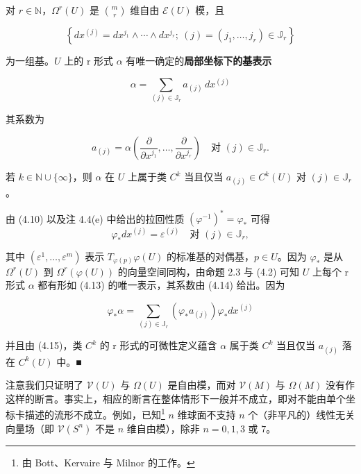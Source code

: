 \begin{remark}
\begin{items}
对 $ r\in\mathbb{N} $，$ \Omega^{r}(U) $ 是 $ \binom{m}{r} $ 维自由 $ \mathcal{E}(U) $ 模，且

\begin{equation}
\left\{ dx^{(j)} = dx^{j_{1}}\wedge\cdots\wedge dx^{j_{r}} ;\ (j) = (j_{1},\ldots,j_{r})\in\mathbb{J}_{r} \right\}\tag{4.12}
\end{equation}

为一组基。$ U $ 上的 r 形式 $ \alpha $ 有唯一确定的\textbf{局部坐标下的基表示}

\begin{equation}
\alpha = \sum_{(j)\in\mathbb{J}_{r}}a_{(j)}\,dx^{(j)}\tag{4.13}
\end{equation}

其系数为

\begin{equation}
a_{(j)} = \alpha\left(\frac{\partial}{\partial x^{j_{1}}},\ldots,\frac{\partial}{\partial x^{j_{r}}}\right) \quad \text{对 } (j)\in\mathbb{J}_{r}.\tag{4.14}
\end{equation}

若 $ k\in\mathbb{N}\cup\{\infty\} $，则 $ \alpha $ 在 $ U $ 上属于类 $ C^{k} $ 当且仅当 $ a_{(j)}\in C^{k}(U) $ 对 $ (j)\in\mathbb{J}_{r} $。

\proofhead
由 (4.10) 以及注 4.4(e) 中给出的拉回性质 $ (\varphi^{-1})^{\ast} = \varphi_{\ast} $ 可得
\begin{equation}
\varphi_{\ast}dx^{(j)} = \varepsilon^{(j)} \quad \text{对 } (j)\in\mathbb{J}_{r},\tag{4.15}
\end{equation}

其中 $ (\varepsilon^{1},\ldots,\varepsilon^{m}) $ 表示 $ T_{\varphi(p)}\varphi(U) $ 的标准基的对偶基，$ p\in U $。因为 $ \varphi_{\ast} $ 是从 $ \Omega^{r}(U) $ 到 $ \Omega^{r}(\varphi(U)) $ 的向量空间同构，由命题 2.3 与 (4.2) 可知 $ U $ 上每个 r 形式 $ \alpha $ 都有形如 (4.13) 的唯一表示，其系数由 (4.14) 给出。因为

\[
\varphi_{\ast}\alpha = \sum_{(j)\in\mathbb{J}_{r}}(\varphi_{\ast}a_{(j)})\varphi_{\ast}dx^{(j)}
\]

并且由 (4.15)，类 $ C^{k} $ 的 r 形式的可微性定义蕴含 $ \alpha $ 属于类 $ C^{k} $ 当且仅当 $ a_{(j)} $ 落在 $ C^{k}(U) $ 中。\nobreak\hspace{0.35em}■

\item

注意我们只证明了 $ \mathcal{V}(U) $ 与 $ \Omega(U) $ 是自由模，而对 $ \mathcal{V}(M) $ 与 $ \Omega(M) $ 没有作这样的断言。事实上，相应的断言在整体情形下一般并不成立，即对不能由单个坐标卡描述的流形不成立。例如，已知\footnote{由 Bott、Kervaire 与 Milnor 的工作。} $ n $ 维球面不支持 $ n $ 个（非平凡的）线性无关向量场（即 $ \mathcal{V}(S^{n}) $ 不是 $ n $ 维自由模），除非 $ n = 0,1,3 $ 或 $ 7 $。


\end{items}
\end{remark}
